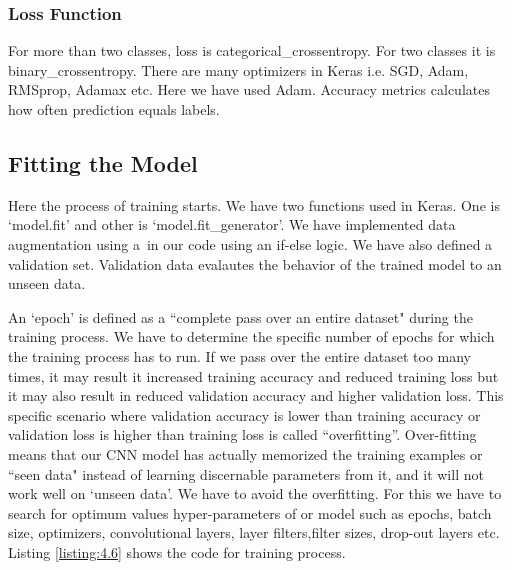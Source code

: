 \subsubsection{Loss Function}

For more than two classes, loss is categorical\_crossentropy. For two
classes it is binary\_crossentropy. There are many optimizers in Keras i.e.
SGD, Adam, RMSprop, Adamax etc. Here we have used Adam. Accuracy metrics calculates how
often prediction equals labels.
\subsection{Fitting the Model}
Here the process of training starts. We have two functions used in Keras. One
is `model.fit' and other is `model.fit\_generator'. We have implemented data augmentation using a\
in our code using an if-else logic. We have also defined a validation set.
Validation data evalautes the behavior of the trained model to an unseen data.

An `epoch' is defined as a ``complete pass over an entire dataset" during the training process.
We have to determine the specific number of epochs for which the training process has to
run. If we pass over the entire dataset too many times,
it may result it increased training accuracy and reduced training loss
but it may also result in reduced validation accuracy and higher validation loss.
This specific scenario where validation accuracy is lower
than training accuracy or validation loss is higher  than
training loss is called ``overfitting''. Over-fitting means that our
CNN model has actually memorized the training examples or ``seen data"
instead of learning discernable parameters from it,
and it will not work well on `unseen data'. We have to avoid the overfitting. For this we have to search for
optimum values hyper-parameters of or model such as epochs,
batch size, optimizers, convolutional layers,
layer filters,filter sizes, drop-out layers etc.
Listing \ref{listing:4.6} shows the code for training process.

